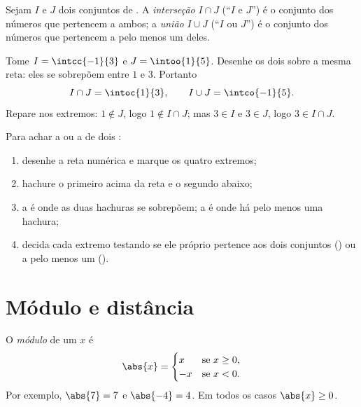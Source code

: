 \begin{definition}\label{def:g10:numbers:interunion}
Sejam $I$ e $J$ dois conjuntos de .
A \emph{interseção} $I \cap J$ (``$I$ e $J$'') é o
conjunto dos números que pertencem a ambos; a
\emph{união} $I \cup J$ (``$I$ ou $J$'') é o conjunto dos
números que pertencem a pelo menos um deles.
\end{definition}

\begin{example}\label{ex:g10:numbers:interunion}
Tome $I = \intcc{-1}{3}$ e $J = \intoo{1}{5}$. Desenhe os dois sobre a
mesma reta: eles se sobrepõem entre $1$ e $3$. Portanto
\[
I \cap J = \intoc{1}{3},
\qquad
I \cup J = \intco{-1}{5}.
\]
Repare nos extremos: $1 \notin J$, logo $1 \notin I \cap J$; mas $3 \in I$
e $3 \in J$, logo $3 \in I \cap J$.
\end{example}

\begin{method}\label{met:g10:numbers:intervals}
Para achar a  ou a  de dois :
\begin{enumerate}
  \item desenhe a reta numérica e marque os quatro extremos;
  \item hachure o primeiro  acima da reta e o segundo abaixo;
  \item a  é onde as duas hachuras se sobrepõem; a  é onde
        há pelo menos uma hachura;
  \item decida cada extremo testando se ele próprio pertence aos dois
        conjuntos () ou a pelo menos um ().
\end{enumerate}
\end{method}

\section{Módulo e distância}

\begin{definition}[Módulo]\label{def:g10:numbers:abs}
O \emph{módulo} de um  $x$ é
\[
\abs{x} =
\begin{cases}
x & \text{se } x \geq 0, \\
-x & \text{se } x < 0.
\end{cases}
\]
Por exemplo, $\abs{7} = 7$ e $\abs{-4} = 4$. Em todos os casos
$\abs{x} \geq 0$.
\end{definition}

